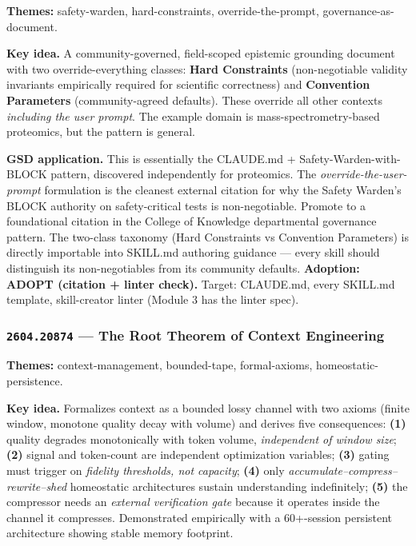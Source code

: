 \documentclass[11pt,letterpaper]{article}
\newcommand{\arxivid}[1]{\texttt{\textcolor{accent}{#1}}}
\newcommand{\paperhead}[2]{\noindent\textbf{\sffamily\textcolor{secondary}{#1}} \textemdash{} #2}
\begin{document}
\paperhead{Themes:}{safety-warden, hard-constraints, override-the-prompt, governance-as-document.}

\textbf{Key idea.} A community-governed, field-scoped epistemic grounding document with two override-everything classes: \textbf{Hard Constraints} (non-negotiable validity invariants empirically required for scientific correctness) and \textbf{Convention Parameters} (community-agreed defaults). These override all other contexts \textit{including the user prompt}. The example domain is mass-spectrometry-based proteomics, but the pattern is general.

\textbf{GSD application.} This is essentially the CLAUDE.md + Safety-Warden-with-BLOCK pattern, discovered independently for proteomics. The \textit{override-the-user-prompt} formulation is the cleanest external citation for why the Safety Warden's BLOCK authority on safety-critical tests is non-negotiable. Promote to a foundational citation in the College of Knowledge departmental governance pattern. The two-class taxonomy (Hard Constraints vs Convention Parameters) is directly importable into SKILL.md authoring guidance --- every skill should distinguish its non-negotiables from its community defaults. \textbf{Adoption: ADOPT (citation + linter check).} Target: CLAUDE.md, every SKILL.md template, skill-creator linter (Module 3 has the linter spec).

\subsubsection{\arxivid{2604.20874} --- The Root Theorem of Context Engineering}

\paperhead{Themes:}{context-management, bounded-tape, formal-axioms, homeostatic-persistence.}

\textbf{Key idea.} Formalizes context as a bounded lossy channel with two axioms (finite window, monotone quality decay with volume) and derives five consequences: \textbf{(1)} quality degrades monotonically with token volume, \textit{independent of window size}; \textbf{(2)} signal and token-count are independent optimization variables; \textbf{(3)} gating must trigger on \textit{fidelity thresholds, not capacity}; \textbf{(4)} only \textit{accumulate--compress--rewrite--shed} homeostatic architectures sustain understanding indefinitely; \textbf{(5)} the compressor needs an \textit{external verification gate} because it operates inside the channel it compresses. Demonstrated empirically with a 60+-session persistent architecture showing stable memory footprint.
\end{document}
